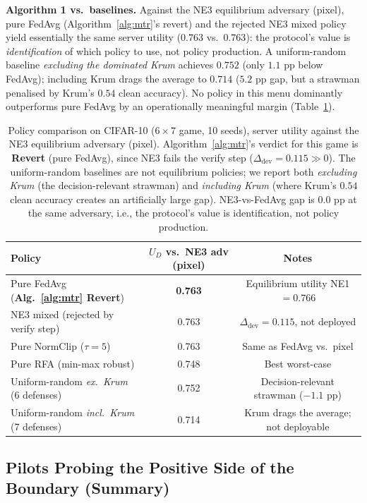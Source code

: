 \documentclass{article}
\begin{document}
\textbf{Algorithm 1 vs.\ baselines.} Against the NE3 equilibrium adversary (pixel), pure FedAvg (Algorithm~\ref{alg:mtr}'s revert) and the rejected NE3 mixed policy yield essentially the same server utility ($0.763$ vs.\ $0.763$): the protocol's value is \emph{identification} of which policy to use, not policy production. A uniform-random baseline \emph{excluding the dominated Krum} achieves $0.752$ (only $1.1$ pp below FedAvg); including Krum drags the average to $0.714$ ($5.2$ pp gap, but a strawman penalised by Krum's $0.54$ clean accuracy). No policy in this menu dominantly outperforms pure FedAvg by an operationally meaningful margin (Table~\ref{tab:policy_comparison}).

\begin{table}[t]
\caption{Policy comparison on CIFAR-10 ($6{\times}7$ game, 10 seeds), server utility against the NE3 equilibrium adversary (pixel). Algorithm~\ref{alg:mtr}'s verdict for this game is \textbf{Revert} (pure FedAvg), since NE3 fails the verify step ($\Delta_{\mathrm{dev}}=0.115 \gg 0$). The uniform-random baselines are not equilibrium policies; we report both \emph{excluding Krum} (the decision-relevant strawman) and \emph{including Krum} (where Krum's $0.54$ clean accuracy creates an artificially large gap). NE3-vs-FedAvg gap is $0.0$ pp at the same adversary, i.e., the protocol's value is identification, not policy production.}
\label{tab:policy_comparison}
\centering\small
\begin{tabular}{lcc}
\toprule
Policy & $U_D$ vs.\ NE3 adv (pixel) & Notes \\
\midrule
Pure FedAvg (\textbf{Alg.~\ref{alg:mtr} Revert}) & \textbf{0.763} & Equilibrium utility NE1 $=0.766$ \\
NE3 mixed (rejected by verify step) & 0.763 & $\Delta_{\mathrm{dev}}=0.115$, not deployed \\
Pure NormClip ($\tau{=}5$)          & 0.763 & Same as FedAvg vs.\ pixel \\
Pure RFA (min-max robust)           & 0.748 & Best worst-case \\
Uniform-random \emph{ex.\ Krum} (6 defenses) & 0.752 & Decision-relevant strawman ($-1.1$ pp) \\
Uniform-random \emph{incl.\ Krum} (7 defenses) & 0.714 & Krum drags the average; not deployable \\
\bottomrule
\end{tabular}
\end{table}

\subsection{Pilots Probing the Positive Side of the Boundary (Summary)}
\label{sec:stateless_pilot}
\end{document}
